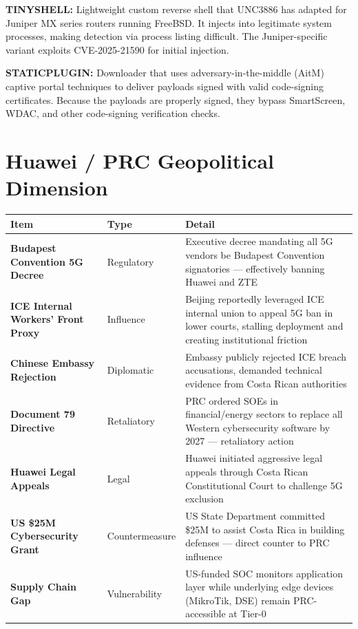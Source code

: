\documentclass[11pt,a4paper]{article}
\begin{document}
\textbf{TINYSHELL:} Lightweight custom reverse shell that UNC3886 has adapted for Juniper MX series routers running FreeBSD. It injects into legitimate system processes, making detection via process listing difficult. The Juniper-specific variant exploits CVE-2025-21590 for initial injection.

\textbf{STATICPLUGIN:} Downloader that uses adversary-in-the-middle (AitM) captive portal techniques to deliver payloads signed with valid code-signing certificates. Because the payloads are properly signed, they bypass SmartScreen, WDAC, and other code-signing verification checks.

\section{Huawei / PRC Geopolitical Dimension}

\begin{longtable}{@{} >{\bfseries}p{3.5cm} p{2cm} p{8cm} @{}}
\toprule
\textbf{Item} & \textbf{Type} & \textbf{Detail} \\
\midrule
\endfirsthead
Budapest Convention 5G Decree & Regulatory & Executive decree mandating all 5G vendors be Budapest Convention signatories --- effectively banning Huawei and ZTE \\
ICE Internal Workers' Front Proxy & Influence & Beijing reportedly leveraged ICE internal union to appeal 5G ban in lower courts, stalling deployment and creating institutional friction \\
Chinese Embassy Rejection & Diplomatic & Embassy publicly rejected ICE breach accusations, demanded technical evidence from Costa Rican authorities \\
Document 79 Directive & Retaliatory & PRC ordered SOEs in financial/energy sectors to replace all Western cybersecurity software by 2027 --- retaliatory action \\
Huawei Legal Appeals & Legal & Huawei initiated aggressive legal appeals through Costa Rican Constitutional Court to challenge 5G exclusion \\
US \$25M Cybersecurity Grant & Countermeasure & US State Department committed \$25M to assist Costa Rica in building defenses --- direct counter to PRC influence \\
Supply Chain Gap & Vulnerability & US-funded SOC monitors application layer while underlying edge devices (MikroTik, DSE) remain PRC-accessible at Tier-0 \\
\bottomrule
\end{longtable}
\end{document}
